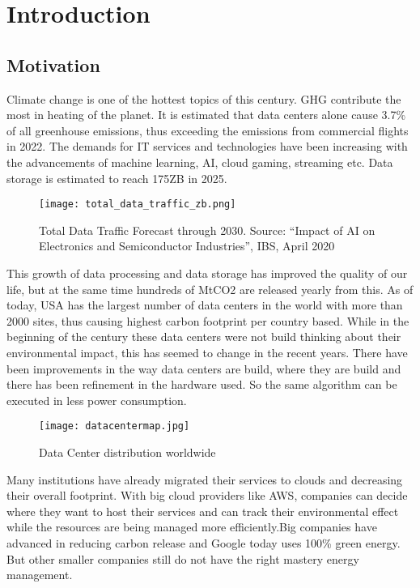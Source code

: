 \documentclass[
  a4paper,  %
  twoside,  %
  bibliography=totoc,
  headsepline,
  cleardoublepage=empty,
  parskip=half,
  draft=false
]{scrbook}
\begin{document}
%
%


\chapter{Introduction}
\section{Motivation}
Climate change is one of the hottest topics of this century. GHG contribute the most in heating of the planet. It is estimated that data centers alone cause 3.7\% of all greenhouse emissions, thus exceeding the emissions from commercial flights in 2022. The demands for IT services and technologies have been increasing with the advancements of machine learning, AI, cloud gaming, streaming etc. Data storage is estimated to reach 175ZB in 2025\cite{zhou2021role}. 
\begin{figure}
	\centering
	\texttt{[image: total\_data\_traffic\_zb.png]}
	\caption{Total Data Traffic Forecast through 2030. Source: “Impact of AI on Electronics and Semiconductor Industries”, IBS, April 2020}
\end{figure}
This growth of data processing and data storage has improved the quality of our life, but at the same time hundreds of MtCO2 are released yearly from this. As of today, USA has the largest number of data centers in the world with more than 2000 sites, thus causing highest carbon footprint per country based. While in the beginning of the century these data centers were not build thinking about their environmental impact, this has seemed to change in the recent years. There have been improvements in the way data centers are build, where they are build and there has been refinement in the hardware used. So the same algorithm can be executed in less power consumption. 
\begin{figure}
	\centering
	\texttt{[image: datacentermap.jpg]}
	\caption{Data Center distribution worldwide}
\end{figure}
Many institutions have already migrated their services to clouds and decreasing their overall footprint. With big cloud providers like AWS, companies can decide where they want to host their services and can track their environmental effect while the resources are being managed more efficiently.Big companies have advanced in reducing carbon release and Google today uses 100\% green energy. But other smaller companies still do not have the right mastery energy management. 
\end{document}
